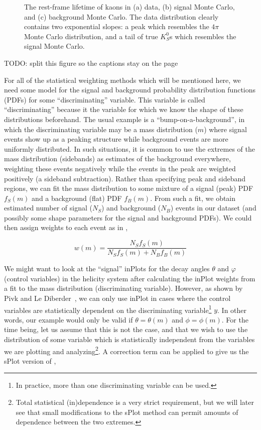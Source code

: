 \begin{figure}
\begin{center}
\begin{subfigure}[b]{.8\columnwidth}
      \caption{}
      \label{fig:rfl-bkgmc}
    \end{subfigure}
  \end{center}
  \caption{The rest-frame lifetime of kaons in (a) data, (b) signal Monte Carlo, and (c) background Monte Carlo. The data distribution clearly contains two exponential slopes: a peak which resembles the $4\pi$ Monte Carlo distribution, and a tail of true $K_S^0$s which resembles the signal Monte Carlo.}\label{fig:rfl-pre-splot}
\end{figure}
{\color{red}TODO: split this figure so the captions stay on the page}

For all of the statistical weighting methods which will be mentioned here, we need some model for the signal and background probability distribution functions (PDFs) for some ``discriminating'' variable. This variable is called ``discriminating'' because it the variable for which we know the shape of these distributions beforehand. The usual example is a ``bump-on-a-background'', in which the discriminating variable may be a mass distribution ($m$) where signal events show up as a peaking structure while background events are more uniformly distributed. In such situations, it is common to use the extremes of the mass distribution (sidebands) as estimates of the background everywhere, weighting these events negatively while the events in the peak are weighted positively (a sideband subtraction). Rather than specifying peak and sideband regions, we can fit the mass distribution to some mixture of a signal (peak) PDF $f_S(m)$ and a background (flat) PDF $f_B(m)$. From such a fit, we obtain estimated number of signal ($N_S$) and background ($N_B$) events in our dataset (and possibly some shape parameters for the signal and background PDFs). We could then assign weights to each event as in ,

\begin{equation}
  w(m) = \frac{N_S f_S(m)}{N_S f_S(m) + N_B f_B(m)}
  \label{eq:inplot-weights-mass}
\end{equation}

We might want to look at the ``signal'' inPlots for the decay angles $\theta$ and $\varphi$ (control variables) in the helicity system after calculating the inPlot weights from a fit to the mass distribution (discriminating variable). However, as shown by Pivk and Le Diberder~\cite{Pivk2005}, we can only use inPlot in cases where the control variables are statistically dependent on the discriminating variable\footnote{In practice, more than one discriminating variable can be used.} $y$. In other words, our example would only be valid if $\theta = \theta(m)$ and $\phi = \phi(m)$. For the time being, let us assume that this is not the case, and that we wish to use the distribution of some variable which is statistically independent from the variables we are plotting and analyzing\footnote{Total statistical (in)dependence is a very strict requirement, but we will later see that small modifications to the sPlot method can permit amounts of dependence between the two extremes.}. A correction term can be applied to give us the sPlot version of ,

